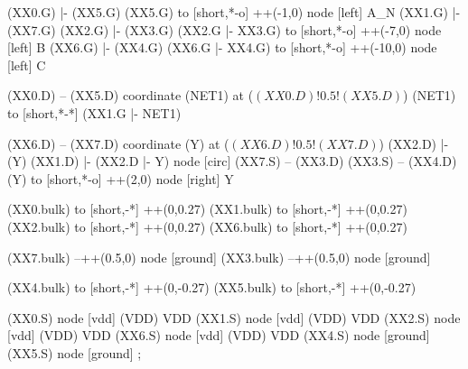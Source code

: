 \begin{circuitikz}[american]

	(XX0.G) |- (XX5.G)
	(XX5.G) to [short,*-o] ++(-1,0) node [left] {A\_N}
	(XX1.G) |- (XX7.G)
	(XX2.G) |- (XX3.G)
	(XX2.G |- XX3.G) to [short,*-o] ++(-7,0) node [left] {B}
	(XX6.G) |- (XX4.G)
	(XX6.G |- XX4.G) to [short,*-o] ++(-10,0) node [left] {C}
	
	(XX0.D) -- (XX5.D)
	coordinate (NET1) at ($(XX0.D)!0.5!(XX5.D)$)
	(NET1) to [short,*-*] (XX1.G |- NET1)
	
	(XX6.D) -- (XX7.D)
	coordinate (Y) at ($(XX6.D)!0.5!(XX7.D)$)
	(XX2.D) |- (Y)
	(XX1.D) |- (XX2.D |- Y) node [circ] {}	
	(XX7.S) -- (XX3.D)
	(XX3.S) -- (XX4.D)
	(Y) to [short,*-o] ++(2,0) node [right] {Y}
	
	(XX0.bulk) to [short,-*] ++(0,0.27)
	(XX1.bulk) to [short,-*] ++(0,0.27)
	(XX2.bulk) to [short,-*] ++(0,0.27)
	(XX6.bulk) to [short,-*] ++(0,0.27)
	
	(XX7.bulk) --++(0.5,0) node [ground] {}
	(XX3.bulk) --++(0.5,0) node [ground] {}
	
	(XX4.bulk) to [short,-*] ++(0,-0.27)
	(XX5.bulk) to [short,-*] ++(0,-0.27)
	

	(XX0.S) node [vdd] (VDD) {VDD}
	(XX1.S) node [vdd] (VDD) {VDD}
	(XX2.S) node [vdd] (VDD) {VDD}
	(XX6.S) node [vdd] (VDD) {VDD}
	(XX4.S) node [ground] {}
	(XX5.S) node [ground] {}
;

\end{circuitikz}
